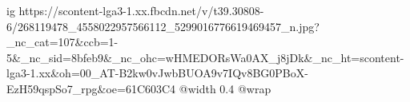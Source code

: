  
 
 
 
 

\ifcmt
  ig https://scontent-lga3-1.xx.fbcdn.net/v/t39.30808-6/268119478_4558022957566112_5299016776619469457_n.jpg?_nc_cat=107&ccb=1-5&_nc_sid=8bfeb9&_nc_ohc=wHMEDORsWa0AX_j8jDk&_nc_ht=scontent-lga3-1.xx&oh=00_AT-B2kw0vJwbBUOA9v7IQv8BG0PBoX-EzH59qspSo7_rpg&oe=61C603C4
  @width 0.4
  @wrap 
\fi
